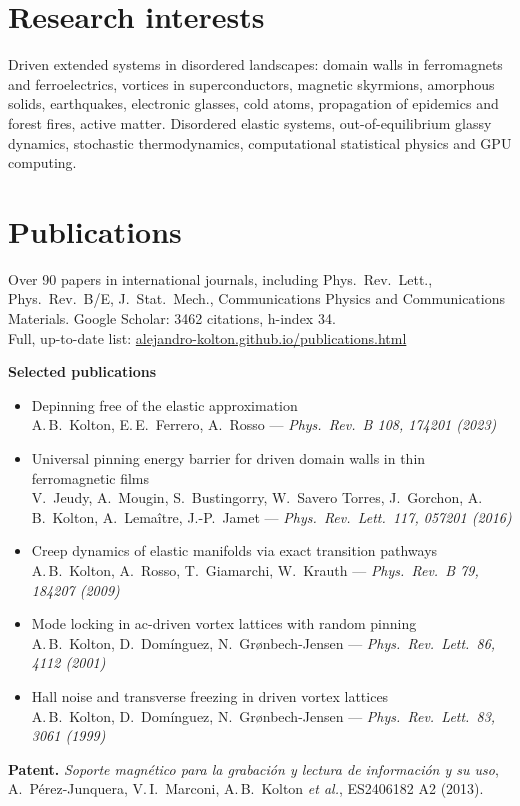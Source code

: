 \documentclass[11pt,a4paper]{article}
\newcommand{\pub}[3]{\item #1\\{\small\color{muted}#2 --- \emph{#3}}}
\begin{document}
\section{Research interests}
Driven extended systems in disordered landscapes: domain walls in ferromagnets and ferroelectrics,
vortices in superconductors, magnetic skyrmions, amorphous solids, earthquakes, electronic glasses,
cold atoms, propagation of epidemics and forest fires, active matter.
Disordered elastic systems, out-of-equilibrium glassy dynamics, stochastic thermodynamics,
computational statistical physics and GPU computing.

\section{Publications}
Over 90 papers in international journals, including Phys.\ Rev.\ Lett., Phys.\ Rev.\ B/E, J.\ Stat.\ Mech.,
Communications Physics and Communications Materials.
Google Scholar: 3462 citations, h-index 34.\\[2pt]
Full, up-to-date list: \href{https://alejandro-kolton.github.io/publications.html}{alejandro-kolton.github.io/publications.html}

\medskip
\textbf{Selected publications}
\begin{itemize}
\pub{Depinning free of the elastic approximation}
{A.\,B.\ Kolton, E.\,E.\ Ferrero, A.\ Rosso}{Phys.\ Rev.\ B 108, 174201 (2023)}
\pub{Universal pinning energy barrier for driven domain walls in thin ferromagnetic films}
{V.\ Jeudy, A.\ Mougin, S.\ Bustingorry, W.\ Savero Torres, J.\ Gorchon, A.\,B.\ Kolton, A.\ Lemaître, J.-P.\ Jamet}{Phys.\ Rev.\ Lett.\ 117, 057201 (2016)}
\pub{Creep dynamics of elastic manifolds via exact transition pathways}
{A.\,B.\ Kolton, A.\ Rosso, T.\ Giamarchi, W.\ Krauth}{Phys.\ Rev.\ B 79, 184207 (2009)}
\pub{Mode locking in ac-driven vortex lattices with random pinning}
{A.\,B.\ Kolton, D.\ Domínguez, N.\ Grønbech-Jensen}{Phys.\ Rev.\ Lett.\ 86, 4112 (2001)}
\pub{Hall noise and transverse freezing in driven vortex lattices}
{A.\,B.\ Kolton, D.\ Domínguez, N.\ Grønbech-Jensen}{Phys.\ Rev.\ Lett.\ 83, 3061 (1999)}
\end{itemize}

\medskip
\textbf{Patent.} \emph{Soporte magnético para la grabación y lectura de información y su uso},
A.\ Pérez-Junquera, V.\,I.\ Marconi, A.\,B.\ Kolton \emph{et al.}, ES2406182 A2 (2013).
\end{document}
